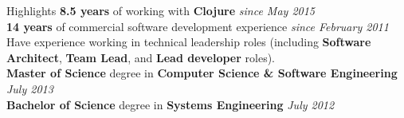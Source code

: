\documentclass{resume} %
\begin{document}

\begin{rSection}{Highlights}
{\bf 8.5 years} of working with {\bf Clojure} \hfill {\em since May 2015} \\
{\bf 14 years} of commercial software development experience \hfill {\em since February 2011} \\
Have experience working in technical leadership roles (including {\bf Software Architect}, {\bf Team Lead}, and {\bf Lead developer} roles). \\
{\bf Master of Science} degree in {\bf Computer Science \& Software Engineering} \hfill {\em July 2013} \\ 
{\bf Bachelor of Science} degree in {\bf Systems Engineering} \hfill {\em July 2012} \\

\end{rSection}

\end{document}
